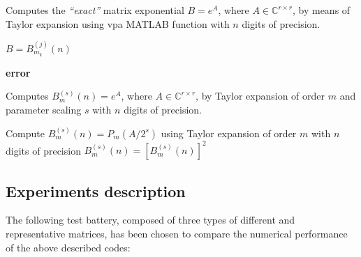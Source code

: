 \documentclass[preprint,10pt,numbers,sort&compress]{elsarticle}
\begin{document}
\begin{algorithm}[H]
\caption{Computes the {\it``exact''} matrix exponential $B=e^{A}$,
where $A \in {\mathbb{C}^{r \times r}}$, by means of Taylor expansion using vpa MATLAB function with $n$ digits of precision.}
\label{Alg_exp_exact}
\begin{algorithmic} [1]

\Return $B={B_{{m_k}}^{(j)}(n)}$
\Else

\Return \textbf{error} 
\EndIf
\end{algorithmic}
\end{algorithm}

\begin{algorithm}[H]
\caption{Computes $B^{(s)}_{m}(n)=e^{A}$,
where $A \in {\mathbb{C}^{r \times r}}$, by Taylor expansion of order $m$ and parameter scaling $s$ with $n$ digits of precision.}
\label{Alg_exp_vpa}
\begin{algorithmic} [1]

\State Compute $B^{(s)}_{m}(n) = {P_{m}}(A/2^{s})$ using Taylor
expansion of order $m$ with $n$ digits of precision
    \State $B^{(s)}_{m}(n)=[B^{(s)}_{m}(n)]^{2}$
 \EndFor
\end{algorithmic}
\end{algorithm}

\subsection{Experiments description}
The following test battery, composed of three types of different and representative matrices, has been chosen to compare the numerical performance of the above described codes:
\end{document}
